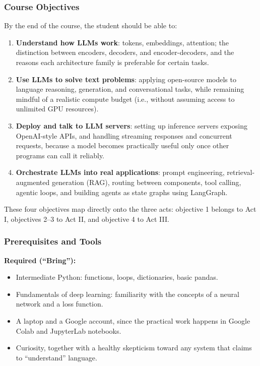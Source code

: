 \subsubsection{Course Objectives}

By the end of the course, the student should be able to:

\begin{enumerate}
    \item \textbf{Understand how LLMs work}: tokens, embeddings, attention; the distinction between encoders, decoders, and encoder-decoders, and the reasons each architecture family is preferable for certain tasks.

    \vspace{0.2cm}
    \item \textbf{Use LLMs to solve text problems}: applying open-source models to language reasoning, generation, and conversational tasks, while remaining mindful of a realistic compute budget (i.e., without assuming access to unlimited GPU resources).

    \vspace{0.2cm}
    \item \textbf{Deploy and talk to LLM servers}: setting up inference servers exposing OpenAI-style APIs, and handling streaming responses and concurrent requests, because a model becomes practically useful only once other programs can call it reliably.

    \vspace{0.2cm}
    \item \textbf{Orchestrate LLMs into real applications}: prompt engineering, retrieval-augmented generation (RAG), routing between components, tool calling, agentic loops, and building agents as state graphs using LangGraph.
\end{enumerate}

These four objectives map directly onto the three acts: objective 1 belongs to Act I, objectives 2--3 to Act II, and objective 4 to Act III.

\subsubsection{Prerequisites and Tools}



\textbf{Required (``Bring''):}
\begin{itemize}
    \item Intermediate Python: functions, loops, dictionaries, basic pandas.
    \item Fundamentals of deep learning: familiarity with the concepts of a neural network and a loss function.
    \item A laptop and a Google account, since the practical work happens in Google Colab and JupyterLab notebooks.
    \item Curiosity, together with a healthy skepticism toward any system that claims to ``understand'' language.
\end{itemize}


